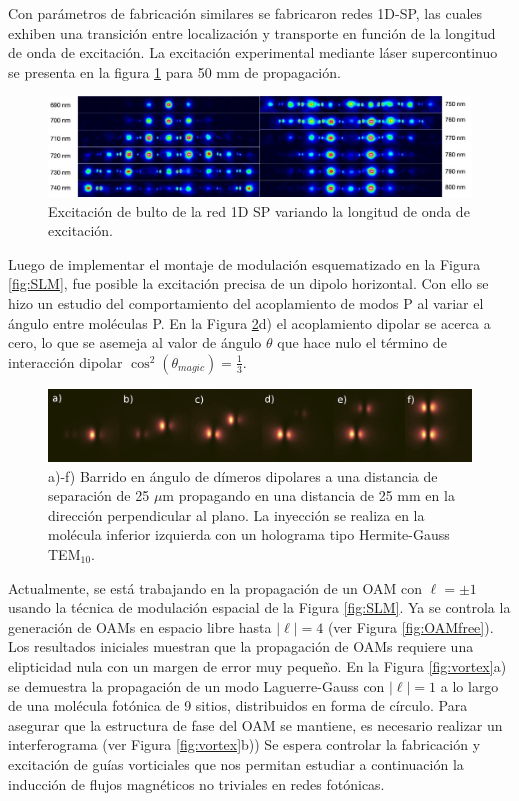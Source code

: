 \documentclass{article}
\begin{document}
Con parámetros de fabricación similares se fabricaron redes 1D-SP, las cuales exhiben una transición entre localización y transporte en función de la longitud de onda de excitación. La excitación experimental mediante láser supercontinuo se presenta en la figura \ref{fig:super} para 50 mm de propagación.

\begin{figure}[H]
	\centering
	\includegraphics[width=1.0\linewidth]{./media/SP1D.jpg}
	\caption{Excitación de bulto de la red 1D SP variando la longitud de onda de excitación. \label{fig:super}}
\end{figure}

Luego de implementar el montaje de modulación esquematizado en la Figura \ref{fig:SLM}, fue posible la excitación precisa de un dipolo horizontal. Con ello se hizo un estudio del comportamiento del acoplamiento de modos P al variar el ángulo entre moléculas P. En la Figura \ref{fig:dipoles}d) el acoplamiento dipolar se acerca a cero, lo que se asemeja al valor de ángulo $\theta$ que hace nulo el término de interacción dipolar $\cos^2(\theta_{magic}) = \frac{1}{3}$.  

\begin{figure}[H]
	\centering
	\includegraphics[width=0.9\linewidth]{./media/dipoles.jpg}
	\caption{a)-f) Barrido en ángulo de dímeros dipolares a una distancia de separación de 25 $\mu$m propagando en una distancia de 25 mm en la dirección perpendicular al plano. La inyección se realiza en la molécula inferior izquierda con un holograma tipo Hermite-Gauss TEM$_{10}$. \label{fig:dipoles}}
\end{figure}


Actualmente, se está trabajando en la propagación de un OAM con $\ell = \pm 1$ usando la técnica de modulación espacial de la Figura \ref{fig:SLM}. Ya se controla la generación de OAMs en espacio libre hasta $|\ell| = 4$ (ver Figura \ref{fig:OAMfree}). Los resultados iniciales muestran que la propagación de OAMs requiere una elipticidad nula con un margen de error muy pequeño. En la Figura \ref{fig:vortex}a) se demuestra la propagación de un modo Laguerre-Gauss con $|\ell| = 1$ a lo largo de una molécula fotónica de 9 sitios, distribuidos en forma de círculo. Para asegurar que la estructura de fase del OAM se mantiene, es necesario realizar un interferograma (ver Figura \ref{fig:vortex}b)) Se espera controlar la fabricación y excitación de guías vorticiales que nos permitan estudiar a continuación la inducción de flujos magnéticos no triviales en redes fotónicas.
\end{document}
